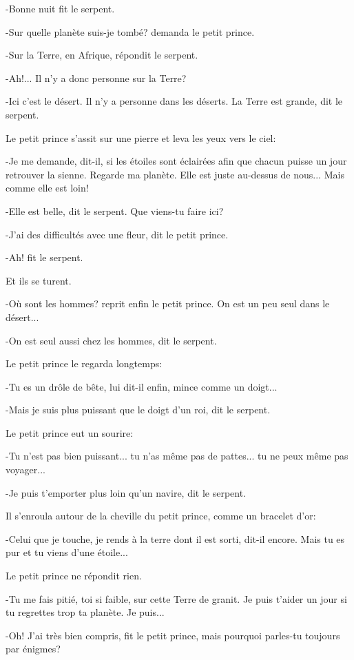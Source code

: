 \documentclass{report}
\begin{document}
-Bonne nuit fit le serpent.

-Sur quelle planète suis-je tombé? demanda le petit prince.

-Sur la Terre, en Afrique, répondit le serpent.

-Ah!... Il n'y a donc personne sur la Terre?

-Ici c'est le désert. Il n'y a personne dans les déserts. La Terre est grande, dit le serpent.

Le petit prince s'assit sur une pierre et leva les yeux vers le ciel:

-Je me demande, dit-il, si les étoiles sont éclairées afin que chacun puisse un jour retrouver la sienne. Regarde ma planète. Elle est juste au-dessus de nous... Mais comme elle est loin!

-Elle est belle, dit le serpent. Que viens-tu faire ici?

-J'ai des difficultés avec une fleur, dit le petit prince.

-Ah! fit le serpent.

Et ils se turent.

-Où sont les hommes? reprit enfin le petit prince. On est un peu seul dans le désert...

-On est seul aussi chez les hommes, dit le serpent.

Le petit prince le regarda longtemps:


-Tu es un drôle de bête, lui dit-il enfin, mince comme un doigt...

-Mais je suis plus puissant que le doigt d'un roi, dit le serpent.

Le petit prince eut un sourire:

-Tu n'est pas bien puissant... tu n'as même pas de pattes... tu ne peux même pas voyager...

-Je puis t'emporter plus loin qu'un navire, dit le serpent.

Il s'enroula autour de la cheville du petit prince, comme un bracelet d'or:

-Celui que je touche, je rends à la terre dont il est sorti, dit-il encore. Mais tu es pur et tu viens d'une étoile...

Le petit prince ne répondit rien.

-Tu me fais pitié, toi si faible, sur cette Terre de granit. Je puis t'aider un jour si tu regrettes trop ta planète. Je puis...

-Oh! J'ai très bien compris, fit le petit prince, mais pourquoi parles-tu toujours par énigmes?
\end{document}

